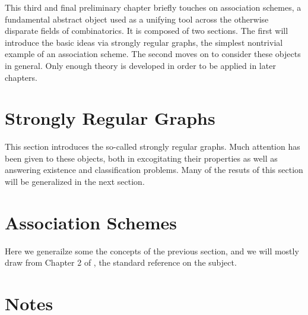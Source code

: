 \documentclass[../../main]{subfiles}
\begin{document}
This third and final preliminary chapter briefly touches on association schemes, a fundamental abstract object used as a unifying tool across the otherwise disparate fields of combinatorics. It is composed of two sections. The first will introduce the basic ideas via strongly regular graphs, the simplest nontrivial example of an association scheme. The second moves on to consider these objects in general. Only enough theory is developed in order to be applied in later chapters.

 \section{Strongly Regular Graphs}
 
 This section introduces the so-called strongly regular graphs. Much attention has been given to these objects, both in excogitating their properties as well as answering existence and classification problems. Many of the resuts of this section will be generalized in the next section.
 
 \dinkus
 
 
 
 \section{Association Schemes}
 
 Here we generailze some the concepts of the previous section, and we will mostly draw from Chapter 2 of \cite{bannaialgebraic}, the standard reference on the subject.
 
 \dinkus
 
 
 
 \singlespace
 
 \section*{\centering Notes}
 \thecnotes
 
 \doublespacing
 
 \biblio
\end{document}
